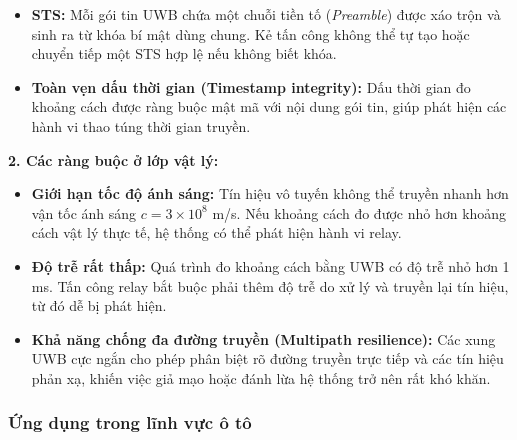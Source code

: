 \begin{itemize}
    \item \textbf{STS:} Mỗi gói tin UWB chứa một chuỗi tiền tố (\textit{Preamble}) được xáo trộn và sinh ra từ khóa bí mật dùng chung. Kẻ tấn công không thể tự tạo hoặc chuyển tiếp một STS hợp lệ nếu không biết khóa.
    
    \item \textbf{Toàn vẹn dấu thời gian (Timestamp integrity):} Dấu thời gian đo khoảng cách được ràng buộc mật mã với nội dung gói tin, giúp phát hiện các hành vi thao túng thời gian truyền.
\end{itemize}
\par\vspace{0.5em}
\textbf{2. Các ràng buộc ở lớp vật lý:}
\par\vspace{0.3em}
\begin{itemize}
    \item \textbf{Giới hạn tốc độ ánh sáng:} Tín hiệu vô tuyến không thể truyền nhanh hơn vận tốc ánh sáng $c = 3 \times 10^8$ m/s. Nếu khoảng cách đo được nhỏ hơn khoảng cách vật lý thực tế, hệ thống có thể phát hiện hành vi relay.
    
    \item \textbf{Độ trễ rất thấp:} Quá trình đo khoảng cách bằng UWB có độ trễ nhỏ hơn 1 ms. Tấn công relay bắt buộc phải thêm độ trễ do xử lý và truyền lại tín hiệu, từ đó dễ bị phát hiện.
    
    \item \textbf{Khả năng chống đa đường truyền (Multipath resilience):} Các xung UWB cực ngắn cho phép phân biệt rõ đường truyền trực tiếp và các tín hiệu phản xạ, khiến việc giả mạo hoặc đánh lừa hệ thống trở nên rất khó khăn.
\end{itemize}

\subsubsection{Ứng dụng trong lĩnh vực ô tô}

